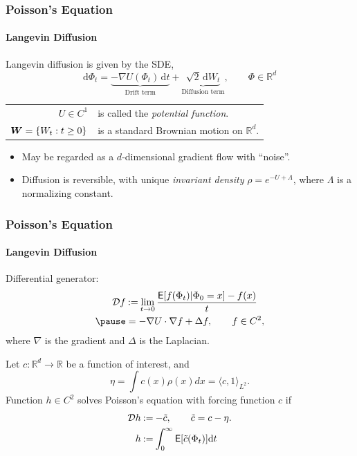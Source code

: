 \documentclass[xcolor=dvipsnames, subsection=false]{beamer}
\def\alertb#1{\alert{\color{BrickRed}  #1}}
\def\alertb#1{\alert{\color{BrickRed}  #1}}
\def\tilc{\tilde c}
\def\Expect{{\sf E}}
\def\bfmath#1{{\mathchoice{\mbox{\boldmath$#1$}}%
{\mbox{\boldmath$#1$}}%
{\mbox{\boldmath$\scriptstyle#1$}}%
{\mbox{\boldmath$\scriptscriptstyle#1$}}}}
\def\bfmW{\bfmath{W}}
\newcommand{\field}[1]{\mathbb{#1}}
\def\Re{\field{R}}
\def\eqdef{\mathbin{:=}}
\def\markovstate{\Phi}
\def\generate{{\cal D}}
\def\ud{\text{d}}
\newcommand{\pot}{U}
\newcommand{\pr}{\rho}
\def\Expect{{\sf E}}
\begin{document}
\begin{frame}
\frametitle{Poisson's Equation}
\framesubtitle{Langevin Diffusion}
\alertb{Langevin diffusion} is given by the SDE,
 {\[
\ud \markovstate_t =\underbrace{- \nabla \pot(\markovstate_t) \, \ud t}_{\text{Drift term}}
+ \underbrace{\sqrt{2} \, \ud W_t}_{\text{Diffusion term}}, \qquad \markovstate \in \Re^d
\label{e:langevin_intro}
\]}
\begin{tabular}{rl}
$\pot \in C^1$ & is called the \textit{potential function}.\\
$\bfmW =\{W_t : t\ge 0\}$ & is a standard Brownian motion on $\Re^d$. \pause \\[1em]
\end{tabular}
\begin{itemize}
\item May be regarded as a $d$-dimensional gradient flow with ``noise''. \pause
\item Diffusion is reversible, with unique \textit{invariant density} $\pr=e^{-\pot+\Lambda}$, where $\Lambda$ is a normalizing constant.
\end{itemize}
\end{frame}

\begin{frame}
\frametitle{Poisson's Equation}
\framesubtitle{Langevin Diffusion}
\alertb{Differential generator}:
\[
\begin{aligned}
 \generate f &\eqdef \lim_{t\to 0} \frac{\Expect [f(\Phi_t)| \Phi_0 = x] - f(x)}{t} \\ \pause
 & = -\nabla \pot \cdot \nabla f + \Delta f,\qquad f\in C^2,
\label{e:Lfish}
\end{aligned}
\]
where $\nabla$ is the gradient and $\Delta$ is the Laplacian. \pause

Let $c \colon \Re^d \to \Re$ be a function of interest, and
\[
\eta = \int c(x) \pr(x) dx = \langle c, 1 \rangle_{L^2}.
\] \pause
Function $h\in C^2$ solves \alertb{Poisson's equation} with forcing function $c$ if
\[
\begin{aligned}
\generate h &\eqdef - \tilc, \qquad  \tilc = c - \eta. \\
h & \eqdef \int_0^\infty \Expect [\tilc(\markovstate_t)] \ud t
\label{e:poissons}
\end{aligned}
\]
\end{frame}
\end{document}
